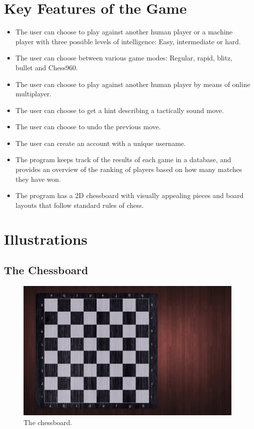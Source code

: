 \documentclass[12pt, a4paper]{article}
\begin{document}
\section{Key Features of the Game}
\begin{itemize}
\item The user can choose to play against another human player or a machine player with three possible levels of intelligence: Easy, intermediate or hard.
\item The user can choose between various game modes: Regular, rapid, blitz, bullet and Chess960.
\item The user can choose to play against another human player by means of online multiplayer.
\item The user can choose to get a hint describing a tactically sound move.
\item The user can choose to undo the previous move.
\item The user can create an account with a unique username.
\item The program keeps track of the results of each game in a database, and provides an overview of the ranking of players based on how many matches they have won.
\item The program has a 2D chessboard with visually appealing pieces and board layouts that follow standard rules of chess.
\end{itemize}

\newpage
\vfill
\section{Illustrations}
\subsection{The Chessboard}

\begin{figure}[h!]
\centering
\includegraphics[width=0.9\linewidth]{figures/board.jpg}
\caption{The chessboard.}
\end{figure}
\end{document}
